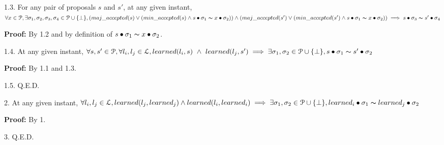 \indent\indent\indent\parbox{\linewidth-\algorithmicindent*3}{\strut1.3. For any pair of proposals $s$ and $s'$, at any given instant, $\forall x \in \mathcal{P}, \exists \sigma_1,\sigma_2,\sigma_3,\sigma_4 \in \mathcal{P} \cup \{\bot\}, (maj\_accepted(s) \lor (min\_accepted(s) \land s \bullet \sigma_1 \thicksim x \bullet \sigma_2)) \land (maj\_accepted(s') \lor (min\_accepted(s') \land s \bullet \sigma_1 \thicksim x \bullet \sigma_2)) \implies s \bullet \sigma_3 \thicksim s' \bullet \sigma_4$}\par
\indent\indent\indent\indent\parbox{\linewidth}{\strut\textbf{Proof:} By 1.2 and by definition of $s \bullet \sigma_1 \thicksim x \bullet \sigma_2$.}\par
\indent\indent\indent\parbox{\linewidth-\algorithmicindent*3}{\strut1.4. At any given instant, $\forall s,s' \in \mathcal{P}, \forall l_i,l_j \in \mathcal{L}, learned(l_i,s)\ \land\ learned(l_j,s') \implies \exists \sigma_1,\sigma_2 \in \mathcal{P} \cup \{\bot\}, s \bullet \sigma_1 \thicksim s' \bullet \sigma_2$ }\par
\indent\indent\indent\indent\parbox{\linewidth}{\strut\textbf{Proof:} By 1.1 and 1.3.}\par
\indent\indent\indent\parbox{\linewidth}{\strut1.5. Q.E.D. }\par
\parbox{\linewidth-\algorithmicindent*3}{\strut2. At any given instant, $\forall l_i,l_j \in \mathcal{L}, learned(l_j,learned_j) \land learned(l_i,learned_i) \implies \exists \sigma_1,\sigma_2 \in \mathcal{P} \cup \{\bot\}, learned_i \bullet \sigma_1 \thicksim learned_j \bullet \sigma_2$}\par
\indent\indent\parbox{\linewidth}{\strut\textbf{Proof:} By 1.}\par
\parbox{\linewidth}{\strut3. Q.E.D.} \par

